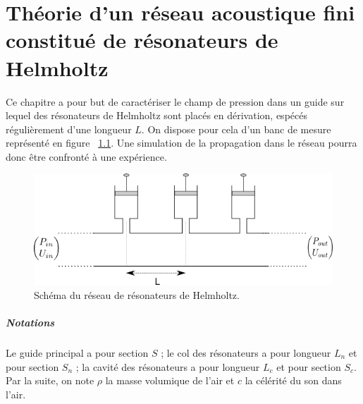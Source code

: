 \chapter{Théorie d'un réseau acoustique fini constitué de résonateurs de Helmholtz}
Ce chapitre a pour but de caractériser le champ de pression dans un guide sur lequel des résonateurs de Helmholtz sont placés en dérivation, espécés régulièrement d'une longueur $L$. On dispose pour cela d'un banc de mesure représenté en figure ~\ref{schema_infini}. Une simulation de la propagation dans le réseau pourra donc être confronté à une expérience.

\begin{figure}[!ht] \centering
\includegraphics[scale=0.5]{./images_chp1/schema_reseau_infini.png}
\caption{\label{schema_infini} Schéma du réseau de résonateurs de Helmholtz.}
\end{figure}

\paragraph{Notations}
Le guide principal a pour section $S$ ; le col des résonateurs a pour longueur $L_{n}$ et pour section $S_{n}$ ; la cavité des résonateurs a pour longueur $L_{c}$ et pour section $S_{c}$. Par la suite, on note $\rho$ la masse volumique de l'air et $c$ la célérité du son dans l'air.

